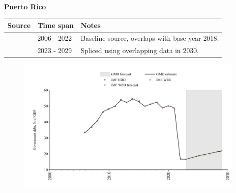 \documentclass[12pt,a4paper,landscape]{article}
\begin{document}
\begin{adjustbox}{max totalsize={\paperwidth}{\paperheight},center}
\begin{minipage}[t][\textheight][t]{\textwidth}
\vspace*{0.5cm}
{}
\begin{center}
{\Large\bfseries Puerto Rico}
\end{center}
\vspace{0.5cm}
\begin{table}[H]
\centering
\small
\begin{tabular}{|l|l|l|}
\hline
\textbf{Source} & \textbf{Time span} & \textbf{Notes} \\
\hline
\rowcolor{white}\cite{IMF_WEO}& 2006 - 2022 &Baseline source, overlaps with base year 2018.\\
\rowcolor{lightgray}\cite{IMF_WEO_forecast}& 2023 - 2029 &Spliced using overlapping data in 2030.\\
\hline
\end{tabular}
\end{table}
\begin{figure}[H]
\centering
\includegraphics[width=\textwidth,height=0.6\textheight,keepaspectratio]{graphs/PRI_govdebt_GDP.pdf}
\end{figure}
\end{minipage}
\end{adjustbox}
\end{document}
